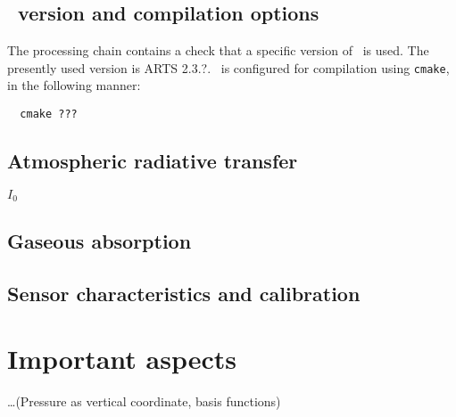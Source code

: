 \subsection{\ARTS\ version and compilation options}
%
The processing chain contains a check that a specific version of \ARTS\ is used.
The presently used version is ARTS 2.3.?. \ARTS\ is configured
for compilation using \texttt{cmake}, in the following manner:
\begin{verbatim}
  cmake ???
\end{verbatim}


\subsection{Atmospheric radiative transfer}
%

$I_0$

\subsection{Gaseous absorption}
%


\subsection{Sensor characteristics and calibration}
%






\section{Important aspects}
\label{sec:arts:aspects}
%
\dots (Pressure as vertical coordinate, basis functions)





